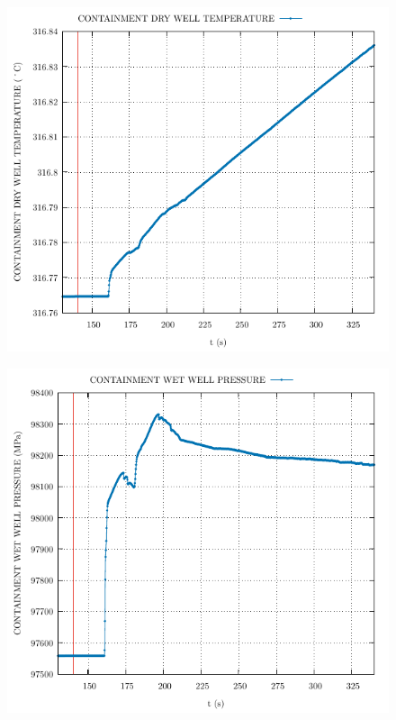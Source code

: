 \documentclass{article}
\begin{document}
\begin{multicols}{2}
\begin{figure}[H]
\end{figure}
\begin{figure}[H]
\centering
\includegraphics[width=\linewidth]{./graphs/CONTAINMENT DRY WELL TEMPERATURE_comp.pdf}
\end{figure}
\begin{figure}[H]
\centering
\includegraphics[width=\linewidth]{./graphs/CONTAINMENT WET WELL PRESSURE_comp.pdf}

\end{figure}
\end{multicols}
\end{document}
